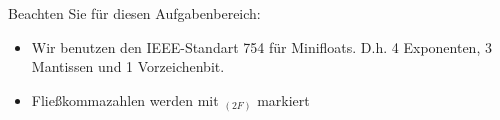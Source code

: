 Beachten Sie für diesen Aufgabenbereich:
\begin{itemize}
	\item Wir benutzen den IEEE-Standart 754 für Minifloats. D.h. 4 Exponenten, 3 Mantissen und 1 Vorzeichenbit.
	\item Fließkommazahlen werden mit $_(2F)$ markiert
\end{itemize}